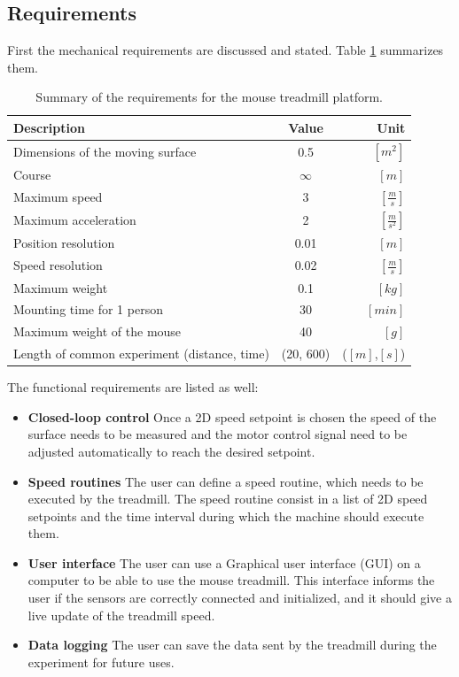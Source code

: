 \documentclass[12pt,a4paper]{article}
\begin{document}
\subsection{Requirements}
First the mechanical requirements are discussed and stated. Table \ref{tab:Requirements} summarizes them.
\begin{table}[H]
	\centering
	\begin{tabular}{l||c|r} 
		\textbf{Description}&\textbf{Value}  &\textbf{Unit}  \\ 
		\hline
		\hline 
		Dimensions of the moving surface & 0.5 & $[m^2]$ \\ 
		\hline 
		Course & $\infty$  & $[m]$  \\ 
		\hline 
		Maximum speed & 3 & $[\frac{m}{s}]$ \\ 
		\hline 
		Maximum acceleration & 2 & $[\frac{m}{s^2}]$  \\ 
		\hline 
		Position resolution & 0.01 & $[m]$  \\ 
		\hline 
		Speed resolution & 0.02  & $[\frac{m}{s}]$  \\ 
		\hline 
		Maximum weight & 0.1  & $[kg]$  \\  
		\hline 
		Mounting time for 1 person & 30 & $[min]$  \\
		\hline 
		Maximum weight of the mouse & 40  & $[g]$ \\
		\hline 
		Length of common experiment (distance, time) & (20, 600)  & ($[m]$,$[s]$)  \\
	\end{tabular} 
	\caption{Summary of the requirements for the mouse treadmill platform.}
	\label{tab:Requirements}
\end{table}
The functional requirements are listed as well:
\begin{itemize}
	\item \textbf{Closed-loop control} Once a 2D speed setpoint is chosen the speed of the surface needs to be measured and the motor control signal need to be adjusted automatically to reach the desired setpoint. 
	\item \textbf{Speed routines} The user can define a speed routine, which needs to be executed by the treadmill. The speed routine consist in a list of 2D speed setpoints and the time interval during which the machine should execute them.
	\item \textbf{User interface} The user can use a Graphical user interface (GUI) on a computer to be able to use the mouse treadmill. This interface informs the user if the sensors are correctly connected and initialized, and it should give a live update of the treadmill speed.
	\item \textbf{Data logging} The user can save the data sent by the treadmill during the experiment for future uses. 
\end{itemize}
\end{document}
